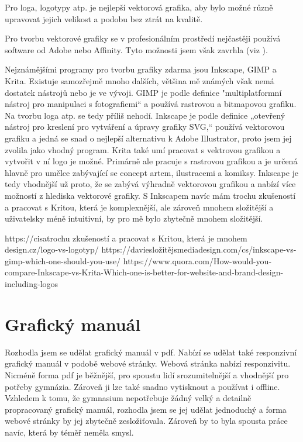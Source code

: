 \documentclass[11pt,a4paper,twoside,openright]{report}
\begin{document}
Pro loga, logotypy atp. je nejlepší vektorová grafika, aby bylo možné různě upravovat jejich velikost a podobu bez ztrát na kvalitě.

Pro tvorbu vektorové grafiky se v profesionálním prostředí nejčastěji používá software od Adobe nebo Affinity. Tyto možnosti jsem však zavrhla (viz ).

Nejznámějšími programy pro tvorbu grafiky zdarma jsou Inkscape, GIMP a Krita. Existuje samozřejmě mnoho dalších, většina mě známých však nemá dostatek nástrojů nebo je ve vývoji.
GIMP je podle definice "multiplatformní nástroj pro manipulaci s fotografiemi“ a používá rastrovou a bitmapovou grafiku. Na tvorbu loga atp. se tedy příliš nehodí.
Inkscape je podle definice „otevřený nástroj pro kreslení pro vytváření a úpravy grafiky SVG,“ používá vektorovou grafiku a jedná se snad o nejlepší alternativu k Adobe Illustrator, proto jsem jej zvolila jako vhodný program.
Krita také umí pracovat s vektrovou grafikou a vytvořit v ní logo je možné. Primárně ale pracuje s rastrovou grafikou a je určená hlavně pro umělce zabývající se concept artem, ilustracemi a komiksy. Inkscape je tedy vhodnější už proto, že se zabývá výhradně vektorovou grafikou a nabízí více možností z hlediska vektorové grafiky. S Inkscapem navíc mám trochu zkušeností a pracovat s Kritou, která je komplexnější, ale zároveň mnohem složitější a uživatelsky méně intuitivní, by pro mě bylo zbytečně mnohem složitější.


https://cisatrochu zkušeností a pracovat s Kritou, která je mnohem design.cz/logo-vs-logotyp/
https://daviesložitějsmediadesign.com/cs/inkscape-vs-gimp-which-one-should-you-use/
https://www.quora.com/How-would-you-compare-Inkscape-vs-Krita-Which-one-is-better-for-website-and-brand-design-including-logos

\section{Grafický manuál}
Rozhodla jsem se udělat grafický manuál v pdf. Nabízí se udělat také responzivní grafický manuál v podobě webové stránky. Webová stránka nabízí responzivitu. Nicméně forma pdf je běžnější, pro spoustu lidí srozumitelnější a vhodnější pro potřeby gymnázia. Zároveň ji lze také snadno vytisknout a používat i offline. Vzhledem k tomu, že gymnasium nepotřebuje žádný velký a detailně propracovaný grafický manuál, rozhodla jsem se jej udělat jednoduchý a forma webové stránky by jej zbytečně zesložiťovala. Zároveň by to byla spousta práce navíc, která by téměř neměla smysl.
\end{document}
